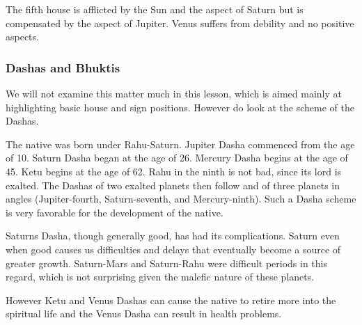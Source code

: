  

The fifth house is afflicted by the Sun and the aspect of Saturn but is compensated by the aspect of Jupiter. Venus suffers from debility and no positive aspects.

 

\subsubsection{Dashas and Bhuktis}

We will not examine this matter much in this lesson, which is aimed mainly at highlighting basic house and sign positions. However do look at the scheme of the Dashas.

 

The native was born under Rahu-Saturn. Jupiter Dasha commenced from the age of 10. Saturn Dasha began at the age of 26. Mercury Dasha begins at the age of 45. Ketu begins at the age of 62. Rahu in the ninth is not bad, since its lord is exalted. The Dashas of two exalted planets then follow and of three planets in angles (Jupiter-fourth, Saturn-seventh, and Mercury-ninth). Such a Dasha scheme is very favorable for the development of the native.

 

Saturns Dasha, though generally good, has had its complications. Saturn even when good causes us difficulties and delays that eventually become a source of greater growth. Saturn-Mars and Saturn-Rahu were difficult periods in this regard, which is not surprising given the malefic nature of these planets.

 

However Ketu and Venus Dashas can cause the native to retire more into the spiritual life and the Venus Dasha can result in health problems.


